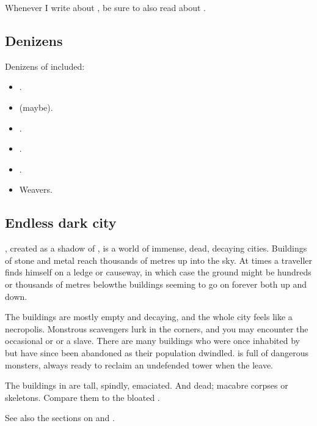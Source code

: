 Whenever I write about \Nyx, be sure to also read about .









\subsection{Denizens}
Denizens of \Nyx included:
\begin{itemize}
  \item \Flyingpolyps.
  \item \Noggyaleth (maybe).
  \item \Ophanim. 
  \item \Resphain. 
  \item \Umbrae.
  \item Weavers.
\end{itemize}









\subsection{Endless dark city}
\Nyx{}, created as a shadow of \Erebos, is a world of immense, dead, decaying cities. Buildings of stone and metal reach thousands of metres up into the sky. At times a traveller finds himself on a ledge or causeway, in which case the ground might be hundreds or thousands of metres below\dash the buildings seeming to go on forever both up and down. 

The buildings are mostly empty and decaying, and the whole city feels like a necropolis. 
Monstrous scavengers lurk in the corners, and you may encounter the occasional \bane{} or \resphan{} or a \human{} slave. 
There are many buildings who were once inhabited by \resphain{} but have since been abandoned as their population dwindled. 
\Nyx{} is full of dangerous monsters, always ready to reclaim an undefended tower when the \resphain{} leave. 

The buildings in \Nyx{} are tall, spindly, emaciated. 
And dead; macabre corpses or skeletons. 
Compare them to the bloated .

See also the sections on  and . 

